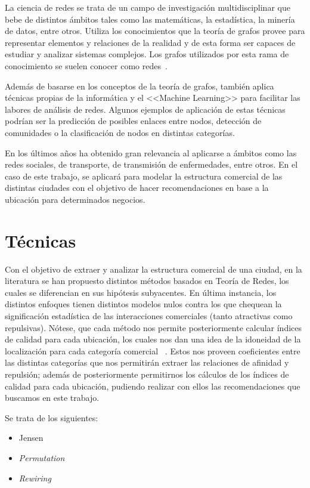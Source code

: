 La ciencia de redes se trata de un campo de investigación multidisciplinar que bebe de distintos ámbitos tales como las matemáticas, la estadística, la minería de datos, entre otros. Utiliza los conocimientos que la teoría de grafos provee para representar elementos y relaciones de la realidad y de esta forma ser capaces de estudiar y analizar sistemas complejos. Los grafos utilizados por esta rama de conocimiento se suelen conocer como redes~\cite{eswiki:151888116}.

Además de basarse en los conceptos de la teoría de grafos, también aplica técnicas propias de la informática y el <<Machine Learning>> para facilitar las labores de análisis de redes. Algunos ejemplos de aplicación de estas técnicas podrían ser la predicción de posibles enlaces entre nodos, detección de comunidades o la clasificación de nodos en distintas categorías.

En los últimos años ha obtenido gran relevancia al aplicarse a ámbitos como las redes sociales, de transporte, de transmisión de enfermedades, entre otros. En el caso de este trabajo, se aplicará para modelar la estructura comercial de las distintas ciudades con el objetivo de hacer recomendaciones en base a la ubicación para determinados negocios.


\section{Técnicas}
Con el objetivo de extraer y analizar la estructura comercial de una ciudad, en la literatura se han propuesto distintos métodos basados en Teoría de Redes, los cuales se diferencian en sus hipótesis subyacentes. En última instancia, los distintos enfoques tienen distintos modelos nulos contra los que chequean la significación estadística de las interacciones comerciales (tanto atractivas como repulsivas). Nótese, que cada método nos permite posteriormente calcular índices de calidad para cada ubicación, los cuales nos dan una idea de la idoneidad de la localización para cada categoría comercial ~\cite{Ahedo2021,RSVAJSSHJG}. Estos nos proveen coeficientes entre las distintas categorías que nos permitirán extraer las relaciones de afinidad y repulsión; además de posteriormente permitirnos los cálculos de los índices de calidad para cada ubicación, pudiendo realizar con ellos las recomendaciones que buscamos en este trabajo.

Se trata de los siguientes:
\begin{itemize}
	\item Jensen
	\item \textit{Permutation}
	\item \textit{Rewiring}
\end{itemize}


